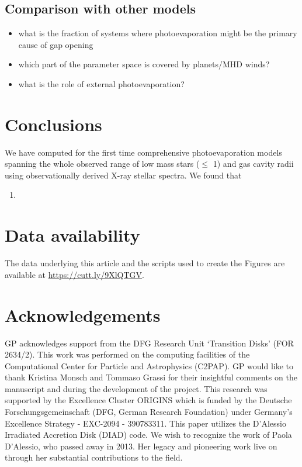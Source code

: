 \documentclass[usenatbib,useAMS,usedcolumn]{mnras}
\begin{document}
\subsection{Comparison with other models}

\begin{itemize}
   \item what is the fraction of systems where photoevaporation might be the primary cause of gap opening
   \item which part of the parameter space is covered by planets/MHD winds?
   \item what is the role of external photoevaporation?
\end{itemize}

\section{Conclusions}\label{sec:conclusions}

  We have computed for the first time comprehensive photoevaporation models spanning the whole observed range of low mass stars ($\leq$ \SI{1}{\solarmass}) and gas cavity radii using observationally derived X-ray stellar spectra. 
  We found that

   \begin{enumerate}
      \item  
   \end{enumerate}

\section{Data availability}
   The data underlying this article and the scripts used to create the Figures are available at \href{https://cutt.ly/9XlQTGV}{https://cutt.ly/9XlQTGV}.

\section*{Acknowledgements}

    GP acknowledges support from the DFG Research Unit ‘Transition Disks’ (FOR 2634/2).
    This work was performed on the computing facilities of the Computational Center for Particle and Astrophysics (C2PAP).
    GP would like to thank Kristina Monsch and Tommaso Grassi for their insightful comments on the manuscript and during the development of the project.
    This research was supported by the Excellence Cluster ORIGINS which is funded by the Deutsche Forschungsgemeinschaft (DFG, German Research Foundation) under Germany's Excellence Strategy - EXC-2094 - 390783311.
    This paper utilizes the D’Alessio Irradiated Accretion Disk (DIAD) code. We wish to recognize the work of Paola D’Alessio, who passed away in 2013. Her legacy and pioneering work live on through her substantial contributions to the field.




\bsp	%
\label{lastpage}
\end{document}
